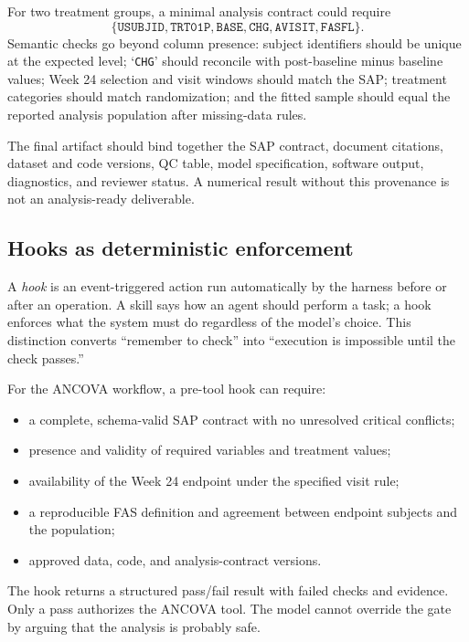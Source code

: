 \documentclass[12pt,oneside]{book}
\numberwithin{equation}{section}
\theoremstyle{definition}
\theoremstyle{plain}
\theoremstyle{remark}
\begin{document}
For two treatment groups, a minimal analysis contract could require
\[
 \{\texttt{USUBJID},\texttt{TRT01P},\texttt{BASE},
 \texttt{CHG},\texttt{AVISIT},\texttt{FASFL}\}.
\]
Semantic checks go beyond column presence: subject identifiers should be
unique at the expected level; `\texttt{CHG}' should reconcile with
post-baseline minus baseline values; Week 24 selection and visit windows should
match the SAP; treatment categories should match randomization; and the fitted
sample should equal the reported analysis population after missing-data rules.

The final artifact should bind together the SAP contract, document citations,
dataset and code versions, QC table, model specification, software output,
diagnostics, and reviewer status.  A numerical result without this provenance
is not an analysis-ready deliverable.

\subsection{Hooks as deterministic enforcement}

A \emph{hook} is an event-triggered action run automatically by the harness
before or after an operation.  A skill says how an agent should perform a task;
a hook enforces what the system must do regardless of the model's choice.  This
distinction converts ``remember to check'' into ``execution is impossible until
the check passes.''

For the ANCOVA workflow, a pre-tool hook can require:
\begin{itemize}
    \item a complete, schema-valid SAP contract with no unresolved critical
    conflicts;
    \item presence and validity of required variables and treatment values;
    \item availability of the Week 24 endpoint under the specified visit rule;
    \item a reproducible FAS definition and agreement between endpoint subjects
    and the population;
    \item approved data, code, and analysis-contract versions.
\end{itemize}
The hook returns a structured pass/fail result with failed checks and evidence.
Only a pass authorizes the ANCOVA tool.  The model cannot override the gate by
arguing that the analysis is probably safe.
\end{document}
